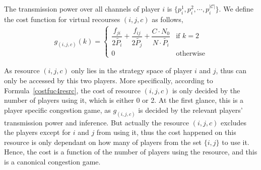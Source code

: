 \documentclass[times]{ettauth}
\theoremstyle{mytheoremstyle}
\theoremstyle{mytheoremstyle}
\theoremstyle{mytheoremstyle}
\begin{document}
The transmission power over all channels of player $i$ is $\{p_i^1, p_i^2,\cdots, p_i^{|\mathcal{C}|}\}$.
We define the cost function for virtual recourses $(i,j,c)$ as follows,
\begin{equation}
\label{costfuc4resrc}
\begin{split}
g_{(i,j,c)}(k) = 
\left\{ \begin{array}{ll}
\dfrac{f_{ji}}{2\tilde{P_i}} + \dfrac{f_{ij}}{2\tilde{P_j}} + \dfrac{C\cdot N_0}{N\cdot \tilde{P_i}} & \mbox{if $k=2$} \\
0 & \mbox{otherwise}
\end{array}
\right.
\end{split}
\end{equation}


As resource $(i,j,c)$ only lies in the strategy space of player $i$ and $j$, thus can only be accessed by this two players.
More specifically, according to Formula~\ref{costfuc4resrc}, the cost of resource $(i,j,c)$ is only decided by the number of players using it, which is either 0 or 2.
At the first glance, this is a player specific congestion game, as $g_{(i,j,c)}$ is decided by the relevant players' transmission power and inference.
But actually the resource ${(i,j,c)}$ excludes the players except for $i$ and $j$ from using it, thus the cost happened on this resource is only dependant on how many of players from the set $\{i, j\}$ to use it.
Hence, the cost is a function of the number of players using the resource, and this is a canonical congestion game.
\end{document}
